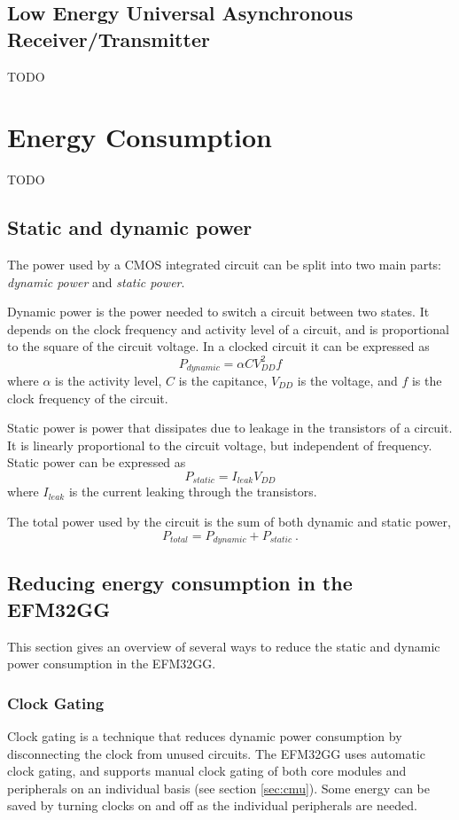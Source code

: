 \subsection{Low Energy Universal Asynchronous Receiver/Transmitter}\label{subsec:leuart}
TODO %



\section{Energy Consumption}
TODO %

\subsection{Static and dynamic power}
The power used by a CMOS integrated circuit can be split into two main parts: \emph{dynamic power} and \emph{static power}. 

Dynamic power is the power needed to switch a circuit between two states. It depends on the clock frequency and activity level of a circuit, and is proportional to the square of the circuit voltage. In a clocked circuit it can be expressed as
$$P_{dynamic} = \alpha CV_{DD}^{2}f$$
where $\alpha$ is the activity level, $C$ is the capitance, $V_{DD}$ is the voltage, and $f$ is the clock frequency of the circuit.

Static power is power that dissipates due to leakage in the transistors of a circuit. It is linearly proportional to the circuit voltage, but independent of frequency. Static power can be expressed as
$$P_{static} = I_{leak}V_{DD}$$
where $I_{leak}$ is the current leaking through the transistors.

The total power used by the circuit is the sum of both dynamic and static power,
$$P_{total} = P_{dynamic} + P_{static}\ .$$
\cite{cmos-vlsi-design}


\subsection{Reducing energy consumption in the EFM32GG}
This section gives an overview of several ways to reduce the static and dynamic power consumption in the EFM32GG.

\subsubsection{Clock Gating}
Clock gating is a technique that reduces dynamic power consumption by disconnecting the clock from unused circuits. The EFM32GG uses automatic clock gating, and supports manual clock gating of both core modules and peripherals on an individual basis (see section \ref{sec:cmu}). Some energy can be saved by turning clocks on and off as the individual peripherals are needed.\cite{efm32-energy-optimization} 


